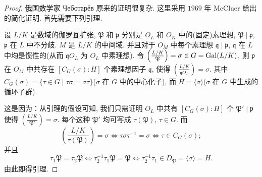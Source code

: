 \begin{proof}
俄国数学家 Чеботарёв 原来的证明很复杂. 这里采用 $1969$ 年 McCluer 给出的简化证明. 首先需要下列引理. 

\setcounter{lemma}{4}%

\begin{lemma}\label{lem:ch5-5}
设 $L/K$ 是数域的伽罗瓦扩张, $\mathfrak{P}$ 和 $\mathfrak{p}$ 分别是 $O_L$ 和 $O_K$ 中的(固定)素理想, $\mathfrak{P}\mid\mathfrak{p}$, $\mathfrak{p}$ 在 $L$ 中不分歧. $M$ 是 $L/K$ 的中间域. 并且对于 $O_M$ 中每个素理想 $\mathfrak{q}\mid\mathfrak{p}$, $\mathfrak{q}$ 在 $L$ 中均是惯性的(从而 $\mathfrak{q}O_L$ 为 $O_L$ 中素理想). 令 $\left(\frac{L/K}{\mathfrak{P}}\right)=\sigma\in G=\operatorname{Gal}(L/K)$, 则 $\mathfrak{p}$ 在 $O_M$ 中共存在 $[C_G(\sigma):H]$ 个素理想因子 $\mathfrak{q}$, 使得 $\left(\frac{L/K}{\mathfrak{q}O_L}\right)=\sigma$. 其中 $C_G(\sigma)=\{\tau\in G\mid\tau\sigma=\sigma\tau\}$($\sigma$ 在 $G$ 中的中心化子), 而 $H=\langle\sigma\rangle$($\sigma$ 在 $G$ 中生成的循环子群). 
\end{lemma}

这是因为：从引理的假设可知, 我们只需证明 $O_L$ 中共有 $[C_G(\sigma):H]$ 个 $\mathfrak{P}'\mid\mathfrak{p}$ 使得 $\left(\frac{L/K}{\mathfrak{P}'}\right)=\sigma$. 每个这种 $\mathfrak{P}'$ 均可写成 $\tau(\mathfrak{P})$, $\tau\in G$. 而
\[
  \left(\frac{L/K}{\tau(\mathfrak{P})}\right)=\sigma
  \Leftrightarrow\tau\sigma\tau^{-1}=\sigma
  \Leftrightarrow\tau\in C_G(\sigma);
\]
并且
\[
  \tau_1\mathfrak{P}=\tau_2\mathfrak{P}
  \Leftrightarrow\tau_2^{-1}\tau_1\mathfrak{P}=\mathfrak{P}
  \Leftrightarrow\tau_2^{-1}\tau_1\in D_{\mathfrak{P}}=\langle\sigma\rangle=H.
\]
由此即得引理. 


\end{proof}
